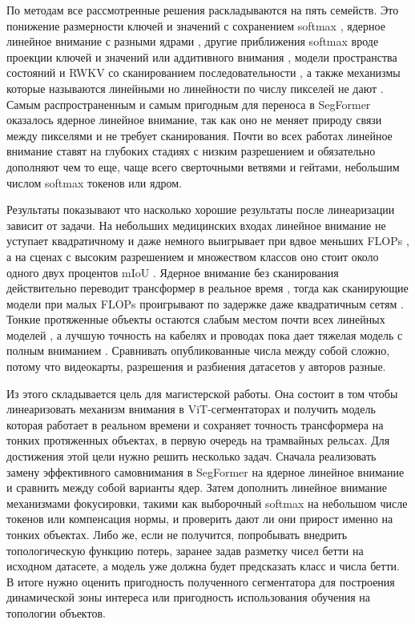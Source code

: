 \documentclass[areasetadvanced]{scrartcl}
\begin{document}
	По методам все рассмотренные решения раскладываются на пять семейств. Это понижение размерности ключей и значений с сохранением softmax
	\cite{segformer}, ядерное линейное внимание с разными ядрами \cite{lsnet, rtlinearformer, glanet, abcfnet, mlformer, wtpmilaunet, mslcfnet, uuekan},
	другие приближения softmax вроде проекции ключей и значений или аддитивного внимания \cite{cltmambaseg, pmp, hlsmvit}, модели пространства состояний
	и RWKV со сканированием последовательности \cite{masavmunet, snakerwkv}, а также механизмы которые называются линейными но линейности по числу
	пикселей не дают \cite{lptnet, caunet}. Самым распространенным и самым пригодным для переноса в SegFormer оказалось ядерное линейное внимание, так
	как оно не меняет природу связи между пикселями и не требует сканирования. Почти во всех работах линейное внимание ставят на глубоких стадиях с
	низким разрешением и обязательно дополняют чем то еще, чаще всего сверточными ветвями и гейтами, небольшим числом softmax токенов или ядром.

	Результаты показывают что насколько хорошие результаты после линеаризации зависит от задачи. На небольших медицинских входах линейное внимание не уступает 
	квадратичному и даже немного выигрывает при вдвое меньших FLOPs \cite{cltmambaseg, mlformer, pmp}, а на сценах с высоким разрешением и множеством классов оно 
	стоит около одного двух процентов mIoU \cite{rtlinearformer, hlsmvit}. Ядерное внимание без сканирования
	действительно переводит трансформер в реальное время \cite{lsnet, rtlinearformer}, тогда как сканирующие модели при малых FLOPs проигрывают по
	задержке даже квадратичным сетям \cite{snakerwkv}. Тонкие протяженные объекты остаются слабым местом почти всех линейных моделей
	\cite{rtlinearformer, lptnet, snakerwkv}, а лучшую точность на кабелях и проводах пока дает тяжелая модель с полным вниманием \cite{fesssam}.
	Сравнивать опубликованные числа между собой сложно, потому что видеокарты, разрешения и разбиения датасетов у авторов разные.

	Из этого складывается цель для магистерской работы. Она состоит в том чтобы линеаризовать механизм внимания в ViT-сегментаторах и
	получить модель которая работает в реальном времени и сохраняет точность трансформера на тонких протяженных объектах, в первую очередь на трамвайных
	рельсах. Для достижения этой цели нужно решить несколько задач. Сначала реализовать замену эффективного самовнимания в SegFormer на ядерное линейное
	внимание и сравнить между собой варианты ядер. Затем дополнить линейное внимание механизмами фокусировки, такими как выборочный softmax на небольшом
	числе токенов или компенсация нормы, и проверить дают ли они прирост именно на тонких объектах. Либо же, если не получится, попробывать внедрить 
	топологическую функцию потерь, заранее задав разметку чисел бетти на исходном датасете, а модель уже должна будет предсказать класс и числа бетти. 
	В итоге нужно оценить пригодность полученного сегментатора для построения динамической зоны интереса или пригодность использования обучения на топологии объектов.
\end{document}
